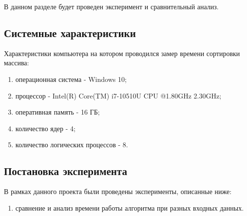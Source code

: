 \documentclass[a4paper, 12pt]{article}
\begin{document}
	\hspace*{5mm} В данном разделе будет проведен эксперимент и сравнительный анализ.
	\subsection{Системные характеристики}
	Характеристики компьютера на котором проводился замер времени сортировки массива:
	\begin{enumerate}
		\item операционная система - Windows 10;
		\item процессор - Intel(R) Core(TM) i7-10510U CPU @1.80GHz 2.30GHz;
		\item оперативная память - 16 ГБ;
		\item количество ядер - 4;
		\item количество логических процессов - 8.
	\end{enumerate}
	\subsection{Постановка эксперимента}
	В рамках данного проекта были проведены эксперименты, описанные ниже:
	\begin{enumerate}
		\item сравнение и анализ времени работы алгоритма при разных входных данных.
	\end{enumerate}
\end{document}

